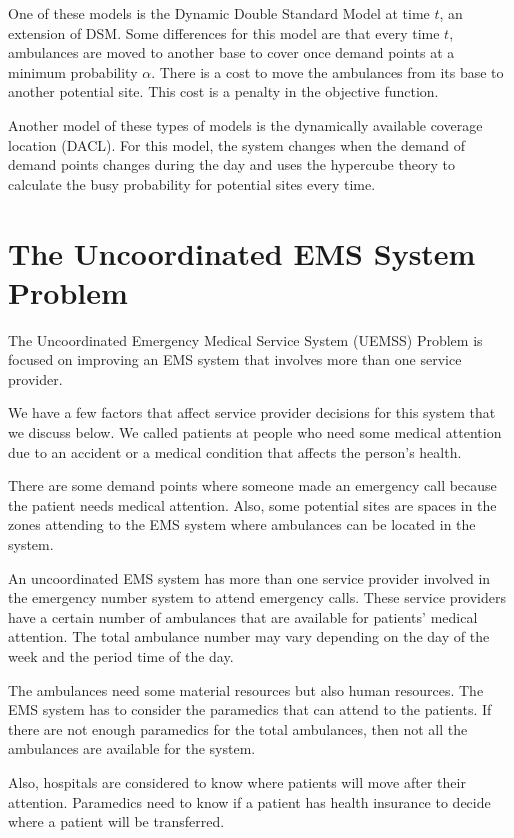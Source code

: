 One of these models is the Dynamic Double Standard Model at time $t$, an extension of DSM. Some differences for this model are that every time $t$, ambulances are moved to another base to cover once demand points at a minimum probability $\alpha$. There is a cost to move the ambulances from its base to another potential site. This cost is a penalty in the objective function. 

Another model of these types of models is the dynamically available coverage location (DACL). For this model, the system changes when the demand of demand points changes during the day and uses the hypercube theory to calculate the busy probability for potential sites every time. 

\chapter{The Uncoordinated EMS System Problem}\label{cap:problem}
The Uncoordinated Emergency Medical Service System (UEMSS) Problem is focused on improving an EMS system that involves more than one service provider. 

We have a few factors that affect service provider decisions for this system that we discuss below. We called patients at people who need some medical attention due to an accident or a medical condition that affects the person's health. 

There are some demand points where someone made an emergency call because the patient needs medical attention. Also, some potential sites are spaces in the zones attending to the EMS system where ambulances can be located in the system.

An uncoordinated EMS system has more than one service provider involved in the emergency number system to attend emergency calls. These service providers have a certain number of ambulances that are available for patients' medical attention. The total ambulance number may vary depending on the day of the week and the period time of the day. 

The ambulances need some material resources but also human resources. The EMS system has to consider the paramedics that can attend to the patients. If there are not enough paramedics for the total ambulances, then not all the ambulances are available for the system. 

Also, hospitals are considered to know where patients will move after their attention. Paramedics need to know if a patient has health insurance to decide where a patient will be transferred. 

